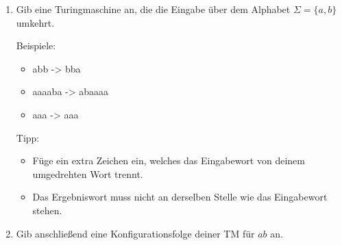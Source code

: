 \documentclass{lehramt-informatik-aufgabe}
\begin{document}
\begin{enumerate}
\item Gib eine Turingmaschine an, die die Eingabe über dem Alphabet
$\Sigma = \{ a, b \}$ umkehrt.

Beispiele:

\begin{itemize}
\item abb -> bba
\item aaaaba -> abaaaa
\item aaa -> aaa
\end{itemize}

Tipp:

\begin{itemize}
\item Füge ein extra Zeichen ein, welches das Eingabewort von deinem
umgedrehten Wort trennt.

\item Das Ergebniswort muss nicht an derselben Stelle wie das
Eingabewort stehen.
\end{itemize}

\item Gib anschließend eine Konfigurationsfolge deiner TM für $ab$ an.

\end{enumerate}

\begin{liAntwort}
\end{liAntwort}
\end{document}
